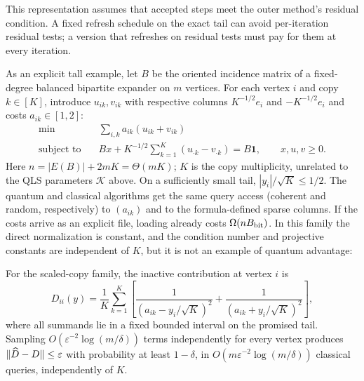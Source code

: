 This representation assumes that accepted steps meet the outer method's
residual condition.  A fixed refresh schedule on the exact tail can avoid
per-iteration residual tests; a version that refreshes on residual tests must
pay for them at every iteration.

As an explicit tall example, let $B$ be the oriented incidence matrix of a
fixed-degree balanced bipartite expander on $m$ vertices.  For each vertex
$i$ and copy $k\in[K]$, introduce $u_{ik},v_{ik}$ with respective columns
$K^{-1/2}e_i$ and $-K^{-1/2}e_i$ and costs $a_{ik}\in[1,2]$:
\begin{equation}
 \begin{aligned}
  \min\quad&\sum_{i,k}a_{ik}(u_{ik}+v_{ik})\\
  \text{subject to}\quad&Bx+K^{-1/2}\sum_{k=1}^K
       (u_{\cdot k}-v_{\cdot k})=B\mathbf1,\qquad x,u,v\geq0.
 \end{aligned}                                           \label{eq:positive-scaled-copy-family}
\end{equation}
Here $n=|E(B)|+2mK=\Theta(mK)$; $K$ is the copy multiplicity, unrelated to
the QLS parameters $\mathcal K$ above.  On a sufficiently small tail,
$|y_i|/\sqrt K\leq1/2$.  The quantum and classical algorithms get the same
query access (coherent and random, respectively) to $(a_{ik})$ and to the
formula-defined sparse columns.  If the costs arrive as an explicit file,
loading already costs $\Omega(nB_{\rm bit})$.  In this family the direct
normalization is constant, and the condition number and projective constants
are independent of $K$, but it is not an example of quantum advantage:

\begin{proposition}
\label{prop:positive-classical-sketch}
For the scaled-copy family, the inactive contribution at vertex $i$ is
\begin{equation}
 D_{ii}(y)=\frac{1}{K}\sum_{k=1}^K\left[
 \frac{1}{(a_{ik}-y_i/\sqrt K)^2}+\frac{1}{(a_{ik}+y_i/\sqrt K)^2}\right], \label{eq:positive-copy-average}
\end{equation}
where all summands lie in a fixed bounded interval on the promised tail.
Sampling $O(\varepsilon^{-2}\log(m/\delta))$ terms independently for every
vertex produces $\lVert\widehat D-D\rVert\leq\varepsilon$ with probability at least
$1-\delta$, in $O(m\varepsilon^{-2}\log(m/\delta))$ classical queries,
independently of $K$.
\end{proposition}

